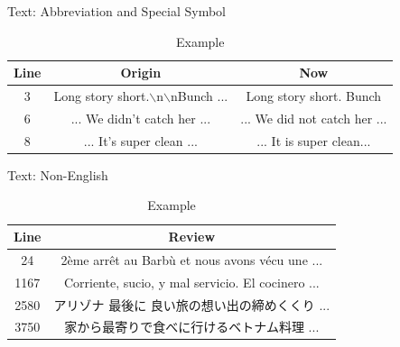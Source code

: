 \documentclass[10pt]{beamer}
\begin{document}

\begin{frame}{Text: Abbreviation and Special Symbol}


\begin{table}[ht]
\caption{Example} %
\centering %
\begin{tabular}{c c c} %
\hline %
Line & Origin & Now \\ [0.5ex] %
\hline %
3 & Long story short.$\backslash$n$\backslash$nBunch ... & Long story short.  Bunch \\
6 & ... We didn't catch her ... & ... We did not catch her ...  \\  
8 & ... It's super clean ... & ... It is super clean...  \\  
\hline %
\end{tabular}
\label{table:nonlin} %
\end{table}
\end{frame}



\begin{frame}{Text: Non-English}

\begin{table}[ht]
\caption{Example} %
\centering %
\begin{tabular}{c c} %
\hline %
Line & Review \\ [0.5ex] %

\hline %
24 & 2ème arrêt au Barbù et nous avons vécu une  ... \\  
1167 & Corriente, sucio, y mal servicio. El cocinero  ... \\  
2580 & アリゾナ 最後に 良い旅の想い出の締めくくり  ... \\  
3750 & 家から最寄りで食べに行けるベトナム料理 ...  \\  
\hline %
\end{tabular}
\label{table:nonlin} %
\end{table}
\end{frame}
\end{document}
